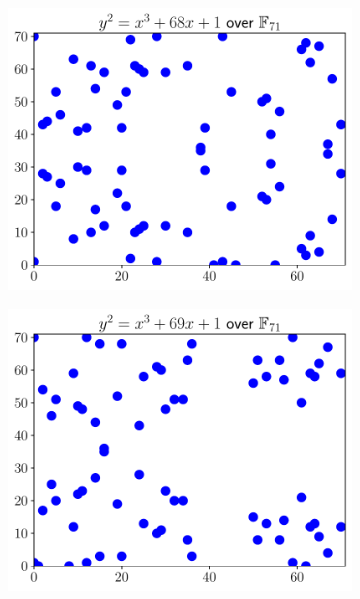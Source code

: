 \begin{figure}[p]
\centering
    \begin{subfigure}[t]{0.45\textwidth}
    \includegraphics[width=\textwidth]{plots/ec_finite/ec_finite_F_71_68_1.pdf}
    \end{subfigure}
    \begin{subfigure}[t]{0.45\textwidth}
    \includegraphics[width=\textwidth]{plots/ec_finite/ec_finite_F_71_69_1.pdf}
    \end{subfigure}


\end{figure}
